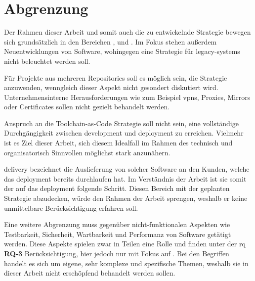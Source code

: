 \section{Abgrenzung}
\label{sec:01-04_demarcation}

Der Rahmen dieser Arbeit und somit auch die zu entwickelnde Strategie bewegen sich grundsätzlich in den Bereichen ,  und . Im Fokus stehen außerdem Neuentwicklungen von Software, wohingegen eine Strategie für \Glspl{legacy-system} nicht beleuchtet werden soll.

Für Projekte aus mehreren Repositories soll es möglich sein, die Strategie anzuwenden, wenngleich dieser Aspekt nicht gesondert diskutiert wird. Unternehmensinterne Herausforderungen wie zum Beispiel \Glspl{vpn}, Proxies, Mirrors oder Certificates sollen nicht gezielt behandelt werden.

Anspruch an die Toolchain-as-Code Strategie soll nicht sein, eine vollständige Durchgängigkeit zwischen \Gls{development} und \Gls{deployment} zu erreichen. Vielmehr ist es Ziel dieser Arbeit, sich diesem Idealfall im Rahmen des technisch und organisatorisch Sinnvollen möglichst stark anzunähern.

\Gls{delivery} bezeichnet die Auslieferung von solcher Software an den Kunden, welche das \Gls{deployment} bereits durchlaufen hat. Im Verständnis der Arbeit ist sie somit der auf das \Gls{deployment} folgende Schritt. Diesen Bereich mit der geplanten Strategie abzudecken, würde den Rahmen der Arbeit sprengen, weshalb er keine unmittelbare Berücksichtigung erfahren soll.

Eine weitere Abgrenzung muss gegenüber nicht-funktionalen Aspekten wie Testbarkeit, Sicherheit, Wartbarkeit und Performanz von Software getätigt werden. Diese Aspekte spielen zwar in Teilen eine Rolle und finden unter der \acrlong{rq} \textbf{RQ-3} Berücksichtigung, hier jedoch nur mit Fokus auf . Bei den Begriffen handelt es sich um eigene, sehr komplexe und spezifische Themen, weshalb sie in dieser Arbeit nicht erschöpfend behandelt werden sollen.

